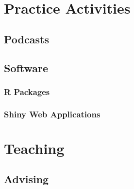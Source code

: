 \documentclass[11pt,a4paper]{moderncv}
\begin{document}
\begin{refsection}
\nocite{*}
\printbibliography[title={Books}, heading=subbibliography]
\end{refsection}

\begin{refsection}
\nocite{*}
\printbibliography[title={Chapters}, heading=subbibliography]
\end{refsection}





\section{Practice Activities}
\subsection{Podcasts}





\subsection{Software}
\subsubsection{R Packages}



\vspace{1em}
\subsubsection{Shiny Web Applications}




\section{Teaching}

\subsection{Advising}
%

\end{document}
